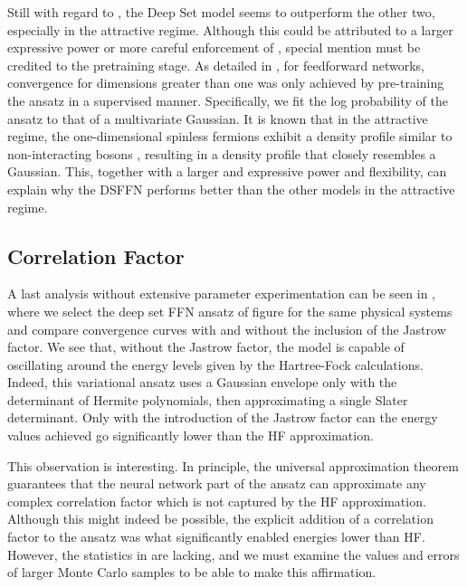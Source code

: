 Still with regard to , the Deep Set model seems to outperform the other two, especially in the attractive regime. Although this could be attributed to a larger expressive power or more careful enforcement of \as, special mention must be credited to the pretraining stage. As detailed in , for feedforward networks, convergence for dimensions greater than one was only achieved by pre-training the ansatz in a supervised manner. Specifically, we fit the log probability of the ansatz to that of a multivariate Gaussian. It is known that in the attractive regime, the one-dimensional spinless fermions exhibit a density profile similar to non-interacting bosons \cite{valiente2020bose}, resulting in a density profile that closely resembles a Gaussian. This, together with a larger and expressive power and flexibility, can explain why the DSFFN performs better than the other models in the attractive regime.

\subsection{Correlation Factor}

A last analysis without extensive parameter experimentation can be seen in , where we select the deep set FFN ansatz of figure  for the same physical systems and compare convergence curves with and without the inclusion of the Jastrow factor. We see that, without the Jastrow factor, the model is capable of oscillating around the energy levels given by the Hartree-Fock calculations. Indeed, this variational ansatz uses a Gaussian envelope only with the determinant of Hermite polynomials, then approximating a single Slater determinant. Only with the introduction of the Jastrow factor can the energy values achieved go significantly lower than the HF approximation.

This observation is interesting. In principle, the universal approximation theorem guarantees that the neural network part of the ansatz can approximate any complex correlation factor which is not captured by the HF approximation. Although this might indeed be possible, the explicit addition of a correlation factor to the ansatz was what significantly enabled energies lower than HF. However, the statistics in  are lacking, and we must examine the values and errors of larger Monte Carlo samples to be able to make this affirmation.

